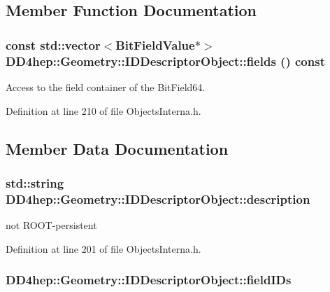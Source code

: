 \subsection{Member Function Documentation}
\hypertarget{class_d_d4hep_1_1_geometry_1_1_i_d_descriptor_object_abdc7d5f4bfdcdc6d7ed8e1fcb42456a9}{
\subsubsection[{fields}]{\setlength{\rightskip}{0pt plus 5cm}const std::vector$<$BitFieldValue$\ast$$>$ DD4hep::Geometry::IDDescriptorObject::fields () const}}
\label{class_d_d4hep_1_1_geometry_1_1_i_d_descriptor_object_abdc7d5f4bfdcdc6d7ed8e1fcb42456a9}


Access to the field container of the BitField64. 

Definition at line 210 of file ObjectsInterna.h.

\subsection{Member Data Documentation}
\hypertarget{class_d_d4hep_1_1_geometry_1_1_i_d_descriptor_object_a2f745060e365a31cb36186dacf26204c}{
\subsubsection[{description}]{\setlength{\rightskip}{0pt plus 5cm}std::string {\bf DD4hep::Geometry::IDDescriptorObject::description}}}
\label{class_d_d4hep_1_1_geometry_1_1_i_d_descriptor_object_a2f745060e365a31cb36186dacf26204c}


not ROOT-\/persistent 

Definition at line 201 of file ObjectsInterna.h.\hypertarget{class_d_d4hep_1_1_geometry_1_1_i_d_descriptor_object_a5f76652b444d990c08435cf7fdc0e4ea}{
\subsubsection[{fieldIDs}]{ {\bf DD4hep::Geometry::IDDescriptorObject::fieldIDs}}}
\label{class_d_d4hep_1_1_geometry_1_1_i_d_descriptor_object_a5f76652b444d990c08435cf7fdc0e4ea}



